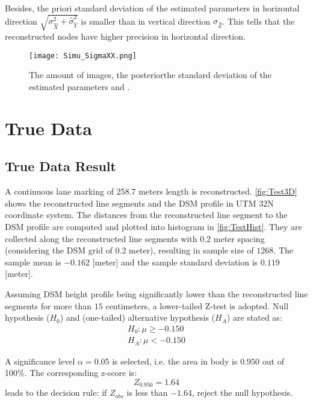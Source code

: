 Besides, the priori standard deviation of the estimated parameters in horizontal direction $\sqrt{\sigma_{\hat{X}}^2+\hat{\sigma}_{\hat{Y}}^2}$ is smaller than in vertical direction $\sigma_{\hat{Z}}$. This tells that {the reconstructed nodes have higher precision in horizontal direction}. 

\begin{figure}
  \centering
  \texttt{[image: Simu\_SigmaXX.png]}
  \caption{\small The amount of images, the posteriorthe standard deviation of the estimated parameters and .}
  \label{fig:SimuSigmaxx}
\end{figure}

\clearpage
\section{True Data}
\label{sec:truedata}

\subsection{True Data Result}
\label{subsec:trueresult}

A continuous lane marking of 258.7 meters length is reconstructed. \cref{fig:Test3D} shows the reconstructed line segments and the DSM profile in UTM 32N coordinate system. The distances from the reconstructed line segment to the DSM profile are computed and plotted into histogram in \cref{fig:TestHist}. They are collected along the reconstructed line segments with 0.2 meter spacing (considering the DSM grid of 0.2 meter), resulting in sample size of $1268$. The sample mean is $-0.162$ [meter] and the sample standard deviation is $0.119$ [meter]. %

Assuming DSM height profile being significantly lower than the reconstructed line segments for more than $15$ centimeters, a lower-tailed Z-test is adopted. Null hypothesis ($H_0$) and (one-tailed) alternative hypothesis ($H_A$) are stated as:
\begin{equation*}
\begin{split}
H_0: \mu\geq-0.150\\
H_A: \mu<-0.150
\end{split}
\end{equation*}

A significance level $\alpha=0.05$ is selected, i.e. the area in body is $0.950$ out of 100\%. The corresponding z-score is:
\begin{equation*}
Z_{0.950}=1.64
\end{equation*}
leads to the decision rule: if $Z_{obs}$ is less than $-1.64$, reject the null hypothesis.

